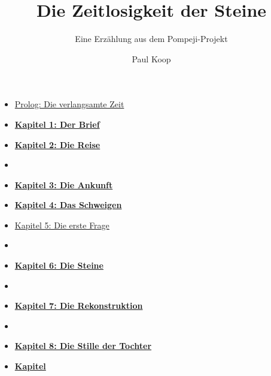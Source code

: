 \documentclass[
  ngerman,
]{article}
\title{Die Zeitlosigkeit der Steine}
\subtitle{Eine Erzählung aus dem Pompeji-Projekt}
\author{Paul Koop}
\date{}
\providecommand{\tightlist}{%
  \setlength{\itemsep}{0pt}\setlength{\parskip}{0pt}}
\begin{document}
\maketitle

{
\setcounter{tocdepth}{3}
\tableofcontents
}
\begin{itemize}
\tightlist
\item
  \protect{}\label{toc-prolog-die-verlangsamte-zeit}\hyperref[prolog-die-verlangsamte-zeit]{Prolog:
  Die verlangsamte Zeit}
\item
  \protect{}\label{toc-kapitel-1-der-brief}\hyperref[kapitel-1-der-brief]{\textbf{Kapitel
  1: Der Brief}}
\item
  \protect{}\label{toc-kapitel-2-die-reise}\hyperref[kapitel-2-die-reise]{\textbf{Kapitel
  2: Die Reise}}
\item
  \protect{}\label{toc-section}\hyperref[section]{\hfill\break
  }
\item
  \protect{}\label{toc-kapitel-3-die-ankunft}\hyperref[kapitel-3-die-ankunft]{\textbf{Kapitel
  3: Die Ankunft}}
\item
  \protect{}\label{toc-kapitel-4-das-schweigen}\hyperref[kapitel-4-das-schweigen]{\textbf{Kapitel
  4: Das Schweigen}}
\item
  \protect{}\label{toc-kapitel-5-die-erste-frage}\hyperref[kapitel-5-die-erste-frage]{Kapitel
  5: Die erste Frage}
\item
  \protect{}\label{toc-section-1}\hyperref[section-1]{\hfill\break
  }
\item
  \protect{}\label{toc-kapitel-6-die-steine}\hyperref[kapitel-6-die-steine]{\textbf{Kapitel
  6: Die Steine}}
\item
  \protect{}\label{toc-section-2}\hyperref[section-2]{\hfill\break
  }
\item
  \protect{}\label{toc-kapitel-7-die-rekonstruktion}\hyperref[kapitel-7-die-rekonstruktion]{\textbf{Kapitel
  7: Die Rekonstruktion}}
\item
  \protect{}\label{toc-section-3}\hyperref[section-3]{\hfill\break
  }
\item
  \protect{}\label{toc-kapitel-8-die-stille-der-tochter}\hyperref[kapitel-8-die-stille-der-tochter]{\textbf{Kapitel
  8: Die Stille der Tochter}}
\item
  \protect{}\label{toc-kapitel-9-die-leere-seite}\hyperref[kapitel-9-die-leere-seite]{\textbf{Kapitel
}}
\end{itemize}
\end{document}
